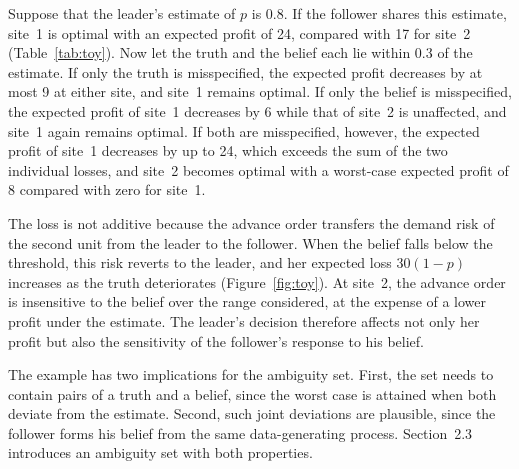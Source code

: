 \documentclass[ijoc,dblanonrev]{informs4}
\begin{document}
Suppose that the leader's estimate of $p$ is $0.8$. If the follower shares
this estimate, site~1 is optimal with an expected profit of 24, compared with
17 for site~2 (Table~\ref{tab:toy}). Now let the truth and the belief each lie
within $0.3$ of the estimate. If only the truth is misspecified, the expected
profit decreases by at most 9 at either site, and site~1 remains optimal. If
only the belief is misspecified, the expected profit of site~1 decreases by 6
while that of site~2 is unaffected, and site~1 again remains optimal. If both
are misspecified, however, the expected profit of site~1 decreases by up to
24, which exceeds the sum of the two individual losses, and site~2 becomes
optimal with a worst-case expected profit of 8 compared with zero for site~1.

The loss is not additive because the advance order transfers the demand risk
of the second unit from the leader to the follower. When the belief falls
below the threshold, this risk reverts to the leader, and her expected loss
$30(1 - p)$ increases as the truth deteriorates (Figure~\ref{fig:toy}). At
site~2, the advance order is insensitive to the belief over the range
considered, at the expense of a lower profit under the estimate. The leader's
decision therefore affects not only her profit but also the sensitivity of
the follower's response to his belief.

The example has two implications for the ambiguity set. First, the set needs
to contain pairs of a truth and a belief, since the worst case is attained
when both deviate from the estimate. Second, such joint deviations are
plausible, since the follower forms his belief from the same data-generating
process. Section~2.3 introduces an ambiguity set with both properties.
\end{document}
